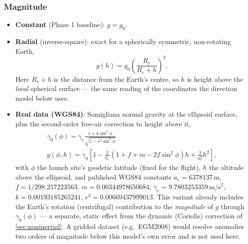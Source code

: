 \subsubsection{Magnitude}
\begin{itemize}
    \item \textbf{Constant} (Phase 1 baseline): $g=g_0$.
    \item \textbf{Radial} (inverse-square): exact for a spherically symmetric, non-rotating Earth,
    \begin{equation}
        g(h)=g_0\left(\frac{R_e}{R_e+h}\right)^2.
    \end{equation}
    Here $R_e+h$ is the distance from the Earth's centre, so $h$ is height above the
    \emph{local} spherical surface --- the same reading of the coordinates the direction model
    below uses.
    \item \textbf{Real data (WGS84)}: Somigliana normal gravity at the ellipsoid surface, plus the
    second-order free-air correction to height above it,
    \begin{gather}
        \gamma_0(\phi) = \gamma_e\frac{1+k\sin^2\phi}{\sqrt{1-e^2\sin^2\phi}} \\
        g(\phi, h) = \gamma_0\left[1 - \frac{2}{a_e}\left(1+f+m-2f\sin^2\phi\right)h + \frac{3}{a_e^2}h^2\right],
    \end{gather}
    with $\phi$ the launch site's geodetic latitude (fixed for the flight), $h$ the altitude above
    the ellipsoid, and published WGS84 constants $a_e=6378137\,\mathrm{m}$,
    $f=1/298.257223563$, $m=0.00344978650684$, $\gamma_e=9.7803253359\,\mathrm{m/s^2}$,
    $k=0.00193185265241$, $e^2=0.00669437999013$. This variant already includes the Earth's
    rotation (centrifugal) contribution to the \emph{magnitude} of $g$ through $\gamma_0(\phi)$ ---
    a separate, static effect from the dynamic (Coriolis) correction of
    \autoref{sec:noninertial}. A gridded dataset (e.g.\ EGM2008) would resolve anomalies two
    orders of magnitude below this model's own error and is not used here.
\end{itemize}

